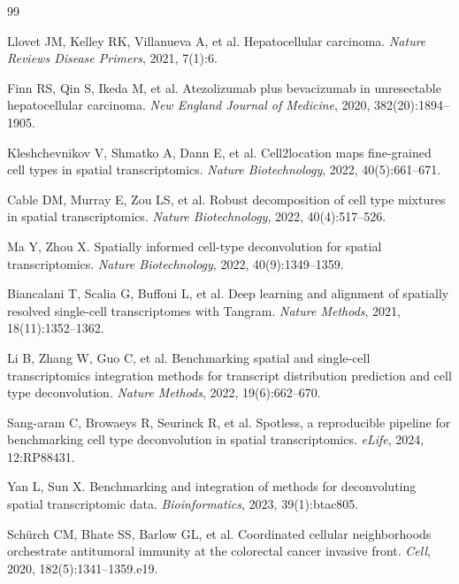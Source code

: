 \documentclass[12pt, a4paper]{ctexart}
\begin{document}

\begin{thebibliography}{99}

Llovet JM, Kelley RK, Villanueva A, et al.
Hepatocellular carcinoma.
\textit{Nature Reviews Disease Primers}, 2021, 7(1):6.

Finn RS, Qin S, Ikeda M, et al.
Atezolizumab plus bevacizumab in unresectable hepatocellular carcinoma.
\textit{New England Journal of Medicine}, 2020, 382(20):1894--1905.

Kleshchevnikov V, Shmatko A, Dann E, et al.
Cell2location maps fine-grained cell types in spatial transcriptomics.
\textit{Nature Biotechnology}, 2022, 40(5):661--671.

Cable DM, Murray E, Zou LS, et al.
Robust decomposition of cell type mixtures in spatial transcriptomics.
\textit{Nature Biotechnology}, 2022, 40(4):517--526.

Ma Y, Zhou X.
Spatially informed cell-type deconvolution for spatial transcriptomics.
\textit{Nature Biotechnology}, 2022, 40(9):1349--1359.

Biancalani T, Scalia G, Buffoni L, et al.
Deep learning and alignment of spatially resolved single-cell transcriptomes with Tangram.
\textit{Nature Methods}, 2021, 18(11):1352--1362.

Li B, Zhang W, Guo C, et al.
Benchmarking spatial and single-cell transcriptomics integration methods for transcript distribution prediction and cell type deconvolution.
\textit{Nature Methods}, 2022, 19(6):662--670.

Sang-aram C, Browaeys R, Seurinck R, et al.
Spotless, a reproducible pipeline for benchmarking cell type deconvolution in spatial transcriptomics.
\textit{eLife}, 2024, 12:RP88431.

Yan L, Sun X.
Benchmarking and integration of methods for deconvoluting spatial transcriptomic data.
\textit{Bioinformatics}, 2023, 39(1):btac805.

Schürch CM, Bhate SS, Barlow GL, et al.
Coordinated cellular neighborhoods orchestrate antitumoral immunity at the colorectal cancer invasive front.
\textit{Cell}, 2020, 182(5):1341--1359.e19.


\end{thebibliography}
\end{document}
